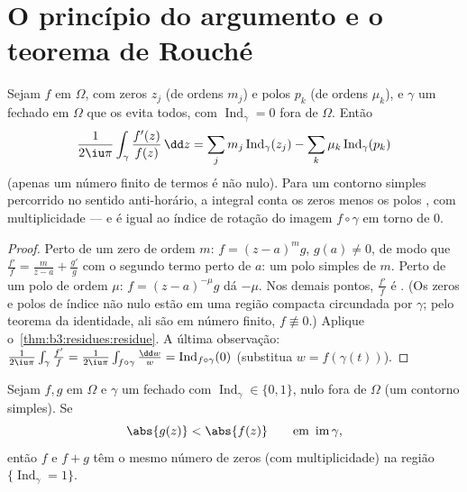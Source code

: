 \section{O princípio do argumento e o teorema de Rouché}

\begin{theorem}
\label{thm:b3:residues:argument}
Sejam $f$  em $\Omega$, com zeros $z_j$ (de ordens
$m_j$) e polos $p_k$ (de ordens $\mu_k$), e $\gamma$ um
 fechado em $\Omega$ que os evita todos, com $\operatorname{Ind}_\gamma = 0$ fora de
$\Omega$. Então
\[
\frac1{2\iu\pi}\int_\gamma\frac{f'(z)}{f(z)}\,\dd z
= \sum_j m_j\operatorname{Ind}_\gamma(z_j)
- \sum_k \mu_k\operatorname{Ind}_\gamma(p_k)
\]
(apenas um número finito de termos é não nulo). Para um contorno simples
percorrido no sentido anti-horário, a integral conta os zeros menos os
polos , com multiplicidade --- e é igual ao índice de rotação
do  imagem $f\circ\gamma$ em torno de $0$.
\end{theorem}

\begin{proof}
Perto de um zero de ordem $m$: $f = (z-a)^mg$, $g(a) \neq 0$, de modo que $\frac{f'}f = \frac m{z - a} + \frac{g'}g$ com o
segundo termo  perto de $a$: um polo simples de 
$m$. Perto de um polo de ordem $\mu$: $f = (z-a)^{-\mu}g$ dá 
$-\mu$. Nos demais pontos, $\frac{f'}f$ é . (Os zeros e polos de
índice não nulo estão em uma região compacta circundada por
$\gamma$; pelo teorema da identidade, ali são em número finito,
$f \not\equiv 0$.) Aplique o~\cref{thm:b3:residues:residue}. A última observação: $\frac1{2\iu\pi}\int_\gamma\frac{f'}f =
\frac1{2\iu\pi}\int_{f\circ\gamma}\frac{\dd w}w =
\operatorname{Ind}_{f\circ\gamma}(0)$ (substitua
$w =
f(\gamma(t))$).
\end{proof}

\begin{theorem}[Rouché]\label{thm:b3:residues:rouche}
Sejam $f, g$  em $\Omega$ e $\gamma$ um 
fechado com $\operatorname{Ind}_\gamma \in \{0,1\}$, nulo fora de $\Omega$ (um contorno simples).
Se
\[
\abs{g(z)} < \abs{f(z)} \qquad \text{em }
\operatorname{im}\gamma,
\]
então $f$ e $f + g$ têm o mesmo número de zeros (com
multiplicidade) na região $\{\operatorname{Ind}_\gamma =
1\}$.
\end{theorem}

